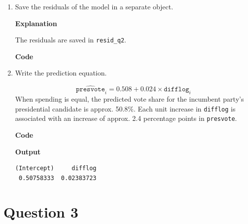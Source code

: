 \documentclass[12pt,letterpaper]{article}
\begin{document}
\begin{enumerate}
		\item Save the residuals of the model in a separate object.	\vspace{.5cm}

		\textbf{Explanation}
		\vspace{.5cm}

		The residuals are saved in \texttt{resid\_q2}.
		\vspace{1cm}

		\textbf{Code}
		

		\item Write the prediction equation.
		\vspace{.5cm}

		\[
		\widehat{\texttt{presvote}}_i = 0.508 + 0.024 \times \texttt{difflog}_i
		\]
		When spending is equal, the predicted vote share for the incumbent party's presidential candidate is approx. 50.8\%. Each unit increase in \texttt{difflog} is associated with an increase of approx. 2.4 percentage points in \texttt{presvote}.
		\vspace{.5cm}

		\textbf{Code}
		
		\vspace{.5cm}
		\textbf{Output}
		\begin{verbatim}
(Intercept)     difflog 
 0.50758333  0.02383723 
		\end{verbatim}
	\end{enumerate}
	
	\newpage	
\section*{Question 3}
\end{document}
